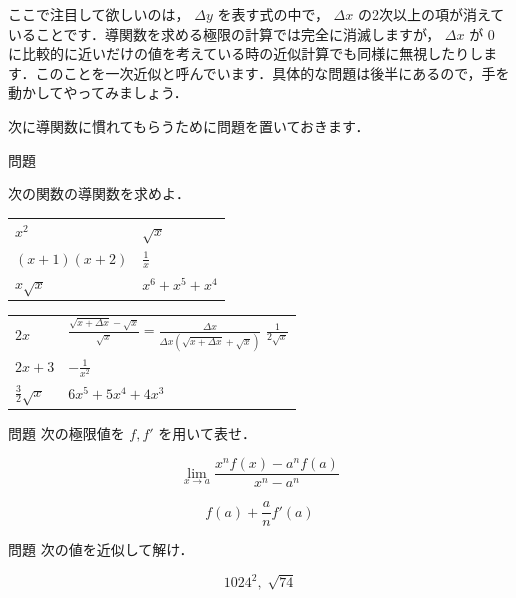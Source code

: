 \documentclass[
  b4paperpaper,
  xelatex,ja=standard]{bxjsbook}
\begin{document}
ここで注目して欲しいのは， \(\Delta y\) を表す式の中で， \(\Delta x\)
の2次以上の項が消えていることです．導関数を求める極限の計算では完全に消滅しますが，
\(\Delta x\) が \(0\)
に比較的に近いだけの値を考えている時の近似計算でも同様に無視したりします．このことを一次近似と呼んでいます．具体的な問題は後半にあるので，手を動かしてやってみましょう．

次に導関数に慣れてもらうために問題を置いておきます．

\begin{Qbox}{問題}

次の関数の導関数を求めよ．

\begin{longtable}[]{@{}ll@{}}
\toprule\noalign{}
\endhead
\bottomrule\noalign{}
\endlastfoot
\(x^2\) & \(\sqrt{x}\) \\
\((x+1)(x+2)\) & \(\frac{1}{x}\) \\
\(x\sqrt{x}\) & \(x^6+x^5+x^4\) \\
\end{longtable}

\end{Qbox}


\begin{longtable}[]{@{}
  >{\raggedright\arraybackslash}p{}
  >{\raggedright\arraybackslash}p{}@{}}
\toprule\noalign{}
\endhead
\bottomrule\noalign{}
\endlastfoot
\(2x\) &
\(\frac{\sqrt{x+\Delta x}-\sqrt{x}}{\sqrt{x}}=\frac{\Delta x}{\Delta x (\sqrt{x+\Delta x}+\sqrt{x})}\)
\(\frac{1}{2\sqrt{x}}\) \\
\(2x+3\) & \(-\frac{1}{x^2}\) \\
\(\frac{3}{2}\sqrt{x}\) & \(6x^5+5x^4+4x^3\) \\
\end{longtable}

\begin{Qbox}{問題}
次の極限値を \(f,f'\) を用いて表せ．

\[\lim_{x\to a}\frac{x^nf(x)-a^nf(a)}{x^n-a^n}\]

\end{Qbox}


\[f(a)+\frac{a}{n}f'(a)\]

\begin{Qbox}{問題}
次の値を近似して解け．

\[1024^2,\; \sqrt{74}\]

\end{Qbox}
\end{document}
